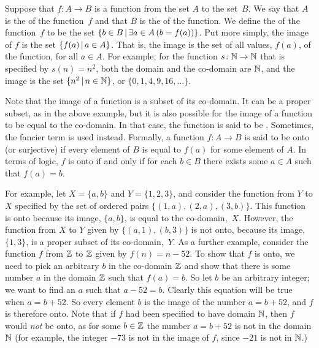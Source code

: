 \medbreak

Suppose that $f\colon A\to B$ is a function from the set $A$ to the set~$B$.  We say that $A$ is the  of the function~$f$ and that $B$ is the  of the function.
We define the  of the function~$f$ to be the set $\{b\in B\,|\, \exists a\in A\,(b=f(a))\}$.
Put more simply, the image of $f$ is the set $\{f(a)\,|\, a\in A\}$.
That is, the image is the set of all values, $f(a)$, of the function, for all $a\in A$.
For example, for the function $s\colon{\mathbb N}\to{\mathbb N}$ that is specified by $s(n)=n^2$, both the domain and the co-domain are ${\mathbb N}$, and the image is the set $\{n^2\,|\, n\in{\mathbb N}\}$, or $\{0,1,4,9,16,\dots\}$.

Note that the image of a function is a subset of its co-domain.
It can be a proper subset, as in the above example, but it is
also possible for the image of a function to be equal to
the co-domain.  In that case, the function is said to be
.  Sometimes, the fancier term
 is used instead.  Formally, a function
$f\colon A\to B$ is said to be onto (or surjective) if
every element of $B$ is equal to $f(a)$ for some element of
$A$.  In terms of logic, $f$ is onto if and only if
for each $b \in B$ there exists some $a \in A$ such that $f(a) = b$.

For example, let $X=\{a,b\}$ and $Y=\{1,2,3\}$, and consider
the function from $Y$ to $X$ specified by the set of ordered
pairs $\{(1,a),(2,a),(3,b)\}$.  This function is onto because
its image, $\{a,b\}$, is equal to the co-domain,~$X$. However,
the function from $X$ to $Y$ given by $\{(a,1),(b,3)\}$ is not
onto, because its image, $\{1,3\}$, is a proper subset of
its co-domain,~$Y$.  As a further example, consider the function
$f$ from ${\mathbb Z}$ to ${\mathbb Z}$ given by $f(n) = n-52$.  To show that $f$
is onto, we need to pick an arbitrary $b$ in the co-domain ${\mathbb Z}$
and show that there is some number $a$ in the domain ${\mathbb Z}$
such that $f(a) = b$.  So let $b$ be an arbitrary integer;
we want to find an $a$ such that $a-52=b$.  Clearly this equation
will be true when $a=b+52$.  So every element $b$ is the image
of the number $a=b+52$, and $f$ is therefore onto.  Note that if
$f$ had been specified to have domain ${\mathbb N}$, then $f$ would
\emph{not} be onto, as for some $b \in {\mathbb Z}$ the number $a=b+52$
is not in the domain ${\mathbb N}$ (for example, the integer $-73$ is
not in the image of $f$, since $-21$ is not in ${\mathbb N}$.)


